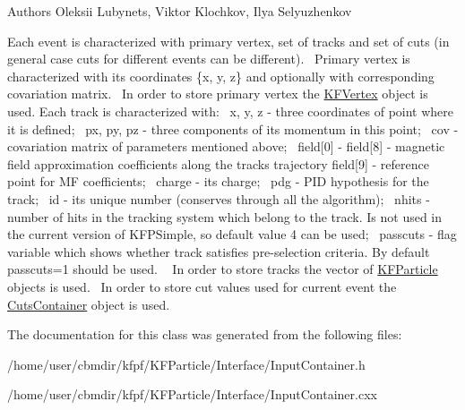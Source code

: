 \begin{DoxyAuthor}{Authors}
Oleksii Lubynets, Viktor Klochkov, Ilya Selyuzhenkov
\end{DoxyAuthor}
Each event is characterized with primary vertex, set of tracks and set of cuts (in general case cuts for different events can be different).~\newline
Primary vertex is characterized with its coordinates \{x, y, z\} and optionally with corresponding covariation matrix.~\newline
In order to store primary vertex the \hyperlink{classKFVertex}{K\+F\+Vertex} object is used. Each track is characterized with\+:~\newline
x, y, z -\/ three coordinates of point where it is defined;~\newline
px, py, pz -\/ three components of its momentum in this point;~\newline
cov -\/ covariation matrix of parameters mentioned above;~\newline
field\mbox{[}0\mbox{]} -\/ field\mbox{[}8\mbox{]} -\/ magnetic field approximation coefficients along the track\textquotesingle{}s trajectory field\mbox{[}9\mbox{]} -\/ reference point for MF coefficients;~\newline
charge -\/ its charge;~\newline
pdg -\/ P\+ID hypothesis for the track;~\newline
id -\/ its unique number (conserves through all the algorithm);~\newline
nhits -\/ number of hits in the tracking system which belong to the track. Is not used in the current version of K\+F\+P\+Simple, so default value 4 can be used;~\newline
passcuts -\/ flag variable which shows whether track satisfies pre-\/selection criteria. By default passcuts=1 should be used. ~\newline
In order to store tracks the vector of \hyperlink{classKFParticle}{K\+F\+Particle} objects is used.~\newline
In order to store cut values used for current event the \hyperlink{classCutsContainer}{Cuts\+Container} object is used. 

The documentation for this class was generated from the following files\+:\begin{DoxyCompactItemize}
\item 
/home/user/cbmdir/kfpf/\+K\+F\+Particle/\+Interface/Input\+Container.\+h\item 
/home/user/cbmdir/kfpf/\+K\+F\+Particle/\+Interface/Input\+Container.\+cxx\end{DoxyCompactItemize}
